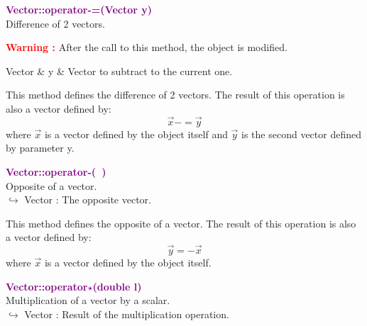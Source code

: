 \textcolor{purple}{\textbf{Vector::operator-=(Vector y)}}\label{Vector::operator-=(Vector y)}\\
Difference of 2 vectors.

\hspace*{10mm}\textcolor{red}{\textbf{Warning :}} After the call to this method, the object is modified.

\begin{tcolorbox}[width=\textwidth,myArgs,tabularx={ll|R}]
Vector & y & Vector to subtract to the current one.
\end{tcolorbox}

This method defines the difference of 2 vectors.
The result of this operation is also a vector defined by:
\begin{equation*}
\overrightarrow{x}-=\overrightarrow{y}
\end{equation*}
where $\overrightarrow{x}$ is a vector defined by the object itself and $\overrightarrow{y}$ is the second vector defined by parameter y.

\textcolor{purple}{\textbf{Vector::operator-(~)}}\label{Vector::operator-()}\\
Opposite of a vector.\\ \hspace*{10mm}$\hookrightarrow$ Vector : The opposite vector.

This method defines the opposite of a vector.
The result of this operation is also a vector defined by:
\begin{equation*}
\overrightarrow{y} = - \overrightarrow{x}
\end{equation*}
where $\overrightarrow{x}$ is a vector defined by the object itself.

\textcolor{purple}{\textbf{Vector::operator$\star$(double l)}}\label{Vector::operator*(double l)}\\
Multiplication of a vector by a scalar.\\ \hspace*{10mm}$\hookrightarrow$ Vector : Result of the multiplication operation.

